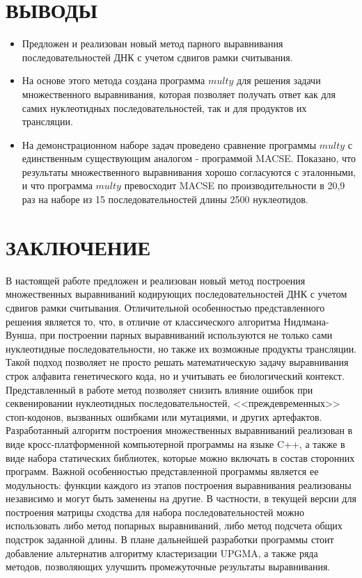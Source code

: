 \newpage
\part*{\large \centering ВЫВОДЫ}
\begin{itemize}
\item Предложен и реализован новый метод парного выравнивания последовательностей ДНК с учетом сдвигов рамки считывания. 
\item На основе этого метода создана программа $multy$ для решения задачи множественного выравнивания, которая позволяет получать ответ как для самих нуклеотидных последовательностей, так и для продуктов их трансляции.
\item На демонстрационном наборе задач проведено сравнение программы $multy$ с единственным существующим аналогом - программой MACSE. Показано, что результаты множественного выравнивания хорошо согласуются с эталонными, и что программа $multy$ превосходит MACSE по производительности в 20,9 раз на наборе из 15 последовательностей длины 2500 нуклеотидов. 
\end{itemize}   

\newpage
\part*{\large \centering ЗАКЛЮЧЕНИЕ}
\hspace{\parindent}В настоящей работе предложен и реализован новый метод построения множественных выравниваний кодирующих последовательностей ДНК с учетом сдвигов рамки считывания. Отличительной особенностью представленного решения является то, что, в отличие от классического алгоритма Нидлмана-Вунша, при построении парных выравниваний используются не только сами нуклеотидные последовательности, но также их возможные продукты трансляции. Такой подход позволяет не просто решать математическую задачу выравнивания строк алфавита генетического кода, но и учитывать ее биологический контекст. Представленный в работе метод позволяет снизить влияние ошибок при секвенировании нуклеотидных последовательностей, <<преждевременных>> стоп-кодонов, вызванных ошибками или мутациями, и других артефактов.\\
\indent Разработанный алгоритм построения множественных выравниваний реализован в виде кросс-платформенной компьютерной программы на языке C++, а также в виде набора статических библиотек, которые можно включать в состав сторонних программ. Важной особенностью представленной программы является ее модульность: функции каждого из этапов построения выравнивания реализованы независимо и могут быть заменены на другие. В частности, в текущей версии для построения матрицы сходства для набора последовательностей можно использовать либо метод попарных выравниваний, либо метод подсчета общих подстрок заданной длины. В плане дальнейшей разработки программы стоит добавление альтернатив алгоритму кластеризации UPGMA, а также ряда методов, позволяющих улучшить промежуточные результаты выравнивания.
